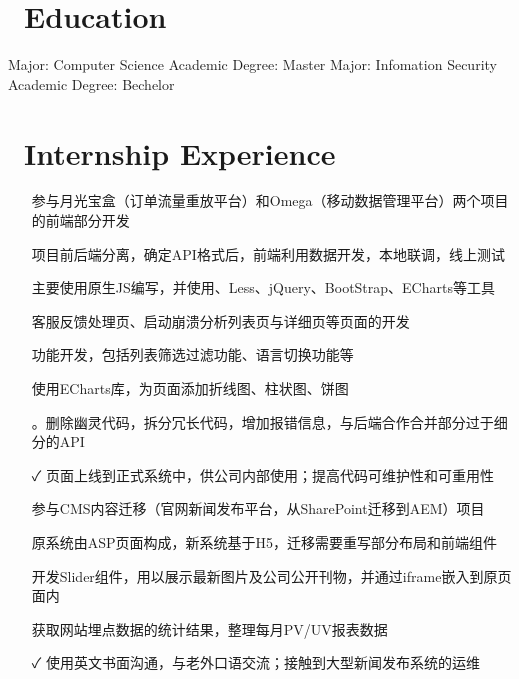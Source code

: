 \documentclass[14pt]{resume}
\begin{document}
\section{\faGraduationCap\  Education}
{{ Major: Computer Science }{\quad\quad\quad\quad\quad\quad\quad\quad\quad\quad\quad\quad\quad\quad\quad\quad\quad\quad\quad Academic Degree: Master}}
{{ Major: Infomation Security }{\quad\quad\quad\quad\quad\quad\quad\quad\quad\quad\quad\quad\quad\quad\quad\quad\quad Academic Degree: Bechelor}}

\section{\faBriefcase\ Internship Experience}
\begin{itemize}
    \item[\faFlagO] 参与月光宝盒（订单流量重放平台）和Omega（移动数据管理平台）两个项目的前端部分开发
    \item[\faFlagO] 项目前后端分离，确定API格式后，前端利用\textbf{\color{red}{Mock}}数据开发，本地联调，线上测试
    \item[\faFlagO] 主要使用原生JS编写，并使用\textbf{\color{red}{模板引擎Simplite}}、Less、jQuery、BootStrap、ECharts等工具
    \item[\faCode] 客服反馈处理页、启动崩溃分析列表页与详细页等页面的开发
    \item[\faCode] 功能开发，包括列表筛选过滤功能、语言切换功能等
    \item[\faCode] 使用ECharts库，为页面添加折线图、柱状图、饼图
    \item[\faCode] \textbf{\color{red}{代码重构}}。删除幽灵代码，拆分冗长代码，增加报错信息，与后端合作合并部分过于细分的API
    \item[\faCheck] 页面上线到正式系统中，供公司内部使用；提高代码可维护性和可重用性
\end{itemize}


\begin{itemize}
    \item[\faFlagO] 参与CMS内容迁移（官网新闻发布平台，从SharePoint迁移到AEM）项目
    \item[\faFlagO] 原系统由ASP页面构成，新系统基于H5，迁移需要重写部分布局和前端组件
    \item[\faCode] 开发Slider组件，用以展示最新图片及公司公开刊物，并通过iframe嵌入到原页面内
    \item[\faCode] 获取网站埋点数据的统计结果，整理每月PV/UV报表数据
    \item[\faCheck] 使用英文书面沟通，与老外口语交流；接触到大型新闻发布系统的运维
\end{itemize}
\end{document}
